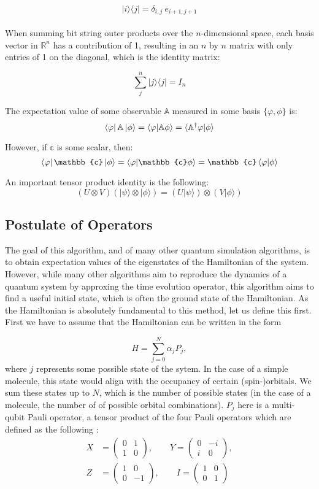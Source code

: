 \documentclass{article}
\def\kb#1#2{| #1 \rangle\!\langle #2 |}
\begin{document}
$$\kb i j = \delta_{i,j} \ e_{i+1, j+1}$$
\\

When summing bit string outer products over the $n$-dimensional space, each basis vector in $\mathbb{R}^{n}$ has a contribution of 1,
resulting in an $n$ by $n$ matrix with only entries of 1 on the diagonal, which is the identity matrix:

$$ \sum_{j}^{n} \kb jj = I_n
$$

The expectation value of some observable $\mathbb{A}$ measured in some basis $\{\varphi, \phi\}$ is:
$$
\left\langle{\varphi}\right\vert \mathbb{A} \left\vert{\phi}\right\rangle = \braket{\varphi}{\mathbb{A}\phi} = \langle \mathbb{A^{\dagger}}\varphi|\phi \rangle
$$

However, if $\mathbb{c}$ is some scalar, then:
$$
\bra{\varphi} \mathbb{c} \ket{\phi} = \braket{\varphi}{\mathbb{c}\phi} = \mathbb{c} \braket{\varphi}{\phi}
$$

An important tensor product identity is the following:
$$
(U \otimes V)(|\psi\rangle \otimes|\phi\rangle)=(U|\psi\rangle) \otimes(V|\phi\rangle)
$$

\subsection{Postulate of Operators}
The goal of this algorithm, and of many other quantum simulation algorithms, is to obtain expectation values of the eigenstates of the Hamiltonian of the system. However, while many other algorithms aim to reproduce the dynamics of a quantum system by approxing the time evolution operator, this algorithm aims to find a useful initial state, which is often the ground state of the Hamiltonian. As the Hamiltonian is absolutely fundamental to this method, let us define this first. First we have to assume that the Hamiltonian can be written in the form

$$
H = \sum_{j=0}^N \alpha_j P_j,
$$
where $j$ represents some possible state of the sytem. In the case of a simple molecule, this state would align with the occupancy of certain (spin-)orbitals. We sum these states up to $N$, which is the number of possible states (in the case of a molecule, the number of of possible orbital combinations). $P_j$ here is a multi-qubit Pauli operator, a tensor product of the four Pauli operators which are defined as the following \cite{nielsen}:
\begin{align*}
X&=\left(\begin{array}{cc}
0 & 1 \\
1 & 0
\end{array}\right), \quad \quad Y=\left(\begin{array}{cc}
0 & -i \\
i & 0
\end{array}\right),\\
 Z&=\left(\begin{array}{cc}
1 & 0 \\
0 & -1
\end{array}\right),\quad \quad I=\left(\begin{array}{cc}
1 & 0 \\
0 & 1
\end{array}\right)
\end{align*}
\end{document}
